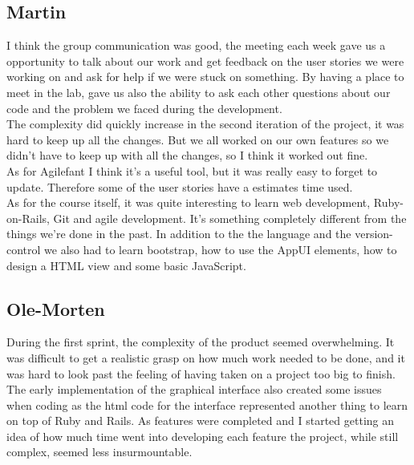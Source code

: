 \documentclass[a4paper]{article}
\begin{document}
\subsection{Martin}
I think the group communication was good, the meeting each week gave us a opportunity to talk about our work and get feedback on the user stories we were working on and ask for help if we were stuck on something. By having a place to meet in the lab, gave us also the ability to ask each other questions about our code and the problem we faced during the development. \\ 
The complexity did quickly increase in the second iteration of the project, it was hard to keep up all the changes. But we all worked on our own features so we didn't have to keep up with all the changes, so I think it worked out fine. \\
As for Agilefant I think it's a useful tool, but it was really easy to forget to update. Therefore some of the user stories have a estimates time used. \\

\noindent
As for the course itself, it was quite interesting to learn web development, Ruby-on-Rails, Git and agile development. It's something completely different from the things we're done in the past. In addition to the the language and the version-control we also had to learn bootstrap, how to use the AppUI elements, how to design a HTML view and some basic JavaScript. 

\subsection{Ole-Morten}
\noindent
During the first sprint, the complexity of the product seemed overwhelming. It was difficult to get a realistic grasp on how much work needed to be done, and it was hard to look past the feeling of having taken on a project too big to finish. The early implementation of the graphical interface also created some issues when coding as the html code for the interface represented another thing to learn on top of Ruby and Rails. As features were completed and I started getting an idea of how much time went into developing each feature the project, while still complex, seemed less insurmountable.\\
\end{document}
